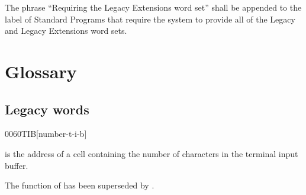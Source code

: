 The phrase ``Requiring the Legacy Extensions word set'' shall be
appended to the label of Standard Programs that require the system
to provide all of the Legacy and Legacy Extensions word sets.
\cbend

\section{Glossary} %

\subsection{Legacy words} %


\begin{worddef}[numTIB]{0060}{\num{}TIB}[number-t-i-b]
\item {}

	 is the address of a cell containing the number
	of characters in the terminal input buffer.

\note {}


	\begin{rationale} %
		The function of  has been superseded by
		.
	\end{rationale}
\end{worddef}


